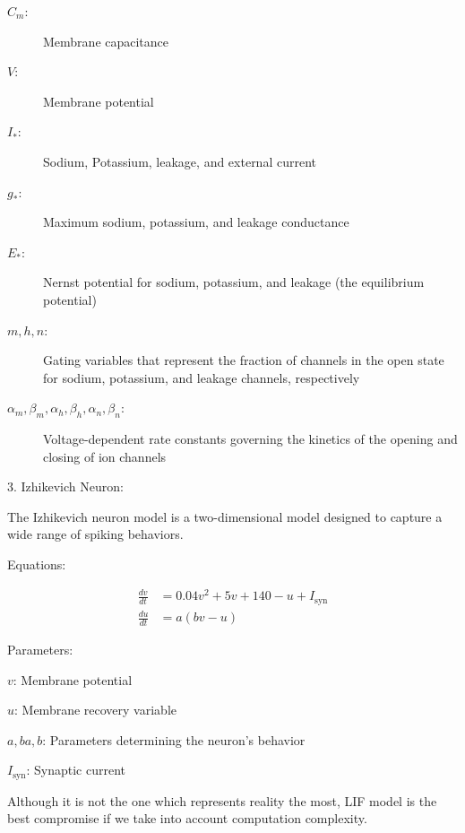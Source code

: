 \documentclass[11pt]{article}
\begin{document}
\begin{flushleft}
\begin{description}
    \item[$C_m$:] Membrane capacitance
    \item[$V$:] Membrane potential
    \item[$I_{\text{*}}$:] Sodium, Potassium, leakage, and external current
    \item[$g_{\text{*}}$:] Maximum sodium, potassium, and leakage conductance
    \item[$E_{\text{*}}$:] Nernst potential for sodium, potassium, and leakage (the equilibrium potential)
    \item[$m, h, n$:] Gating variables that represent the fraction of channels in the open state for sodium, potassium, and leakage channels, respectively
    \item[$\alpha_m, \beta_m, \alpha_h, \beta_h, \alpha_n, \beta_n$:] Voltage-dependent rate constants governing the kinetics of the opening and closing of ion channels
\end{description}
\end{flushleft}



3. Izhikevich Neuron:

The Izhikevich neuron model is a two-dimensional model designed to capture a wide range of spiking behaviors.

Equations:

\begin{align*}
\frac{dv}{dt} &= 0.04v^2 + 5v + 140 - u + I_{\text{syn}} \\
\frac{du}{dt} &= a(bv - u)
\end{align*}


Parameters:

    $v$: Membrane potential
    
    $u$: Membrane recovery variable
    
    $a,ba,b$: Parameters determining the neuron's behavior
    
    $I_{\text{syn}}$​: Synaptic current


Although it is not the one which represents reality the most, LIF model is the best compromise if we take into account computation complexity.
\end{document}
